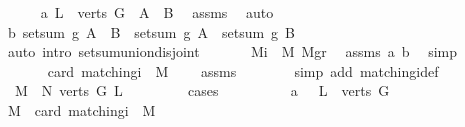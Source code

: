 \begin{isabellebody}
\ \ \ \ \isamarkupfalse%
\ a{\isacharcolon}\ {\isachardoublequoteopen}L\ {\isacharbackquote}\ verts\ G\ {\isacharequal}\ {\isacharquery}A\ {\isasymunion}\ {\isacharquery}B{\isachardoublequoteclose}\ \isamarkupfalse%
\ assms\ \isamarkupfalse%
\ auto\isanewline
\ \ \ \ \isamarkupfalse%
\ b{\isacharcolon}\ {\isachardoublequoteopen}setsum\ {\isacharquery}g\ {\isacharparenleft}{\isacharquery}A\ {\isasymunion}\ {\isacharquery}B{\isacharparenright}\ {\isacharequal}\ setsum\ {\isacharquery}g\ {\isacharquery}A\ {\isacharplus}\ setsum\ {\isacharquery}g\ {\isacharquery}B{\isachardoublequoteclose}\isanewline
\ \ \ \ \ \ \isamarkupfalse%
\ {\isacharparenleft}auto\ intro{\isacharcolon}\ setsum{\isachardot}union{\isacharunderscore}disjoint{\isacharparenright}\isanewline
\ \ \ \ \isamarkupfalse%
\ {}{\isacharcolon}\ {\isachardoublequoteopen}{\isacharquery}Mi\ {\isacharequal}\ {\isacharquery}M{}{}{\isacharplus}\ {\isacharquery}Mgr{}{\isachardoublequoteclose}\ \isamarkupfalse%
\ assms\ a\ b\ \isamarkupfalse%
\ simp\isanewline
\ \ \ \ \isamarkupfalse%
\isanewline
\ \ \ \ \isamarkupfalse%
\ {}{\isacharcolon}\ {\isachardoublequoteopen}card\ {\isacharparenleft}matching{\isacharunderscore}i\ {}\ M{\isacharparenright}\ {\isacharequal}\ {}{\isachardoublequoteclose}\ \isamarkupfalse%
\ assms\isanewline
\ \ \ \ \ \ \isamarkupfalse%
\ {\isacharparenleft}simp\ add{\isacharcolon}\ matching{\isacharunderscore}i{\isacharunderscore}def{\isacharparenright}\isanewline
\ \ \ \ \ \ \isamarkupfalse%
\ {}{\isacharcolon}\ {\isachardoublequoteopen}{\isacharquery}M{}{}\ {\isasymle}\ N\ {\isacharparenleft}verts\ G{\isacharparenright}\ L\ {}{\isachardoublequoteclose}\isanewline
\ \ \ \ \ \ \isamarkupfalse%
\ cases\isanewline
\ \ \ \ \ \ \ \ \isamarkupfalse%
\ a{\isacharcolon}\ {\isachardoublequoteopen}{}\ {\isasymin}\ L\ {\isacharbackquote}\ verts\ G{\isachardoublequoteclose}\isanewline
\ \ \ \ \ \ \ \ \isamarkupfalse%
\ {\isachardoublequoteopen}{\isacharquery}M{}{}\ {\isacharequal}\ card\ {\isacharparenleft}matching{\isacharunderscore}i\ {}\ M{\isacharparenright}{\isachardoublequoteclose}\ \isanewline
\ \ \ \ \ \ \ \ \isamarkupfalse%

\end{isabellebody}
